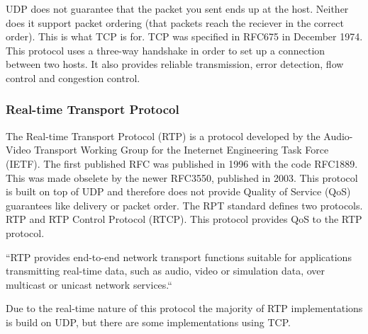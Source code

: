 UDP does not guarantee that the packet you sent ends up at the host. Neither does it support packet ordering (that packets reach the reciever in the correct order). This is what TCP is for. TCP was specified in RFC675 in December 1974. This protocol uses a three-way handshake in order to set up a connection between two hosts. It also provides reliable transmission, error detection, flow control and congestion control. 

\subsubsection{Real-time Transport Protocol}
The Real-time Transport Protocol (RTP) is a protocol developed by the Audio-Video Transport Working Group for the Ineternet Engineering Task Force (IETF). The first published RFC was published in 1996 with the code RFC1889. This was made obselete by the newer RFC3550, published in 2003\cite{RFC3550}. This protocol is built on top of UDP and therefore does not provide Quality of Service (QoS) guarantees like delivery or packet order. The RPT standard defines two protocols. RTP and RTP Control Protocol (RTCP). This protocol provides QoS to the RTP protocol.

``RTP provides end-to-end network transport functions suitable for applications transmitting real-time data, such as audio, video or simulation data, over multicast or unicast network services.``\cite{RFC3550}

Due to the real-time nature of this protocol the majority of RTP implementations is build on UDP, but there are some implementations using TCP.







